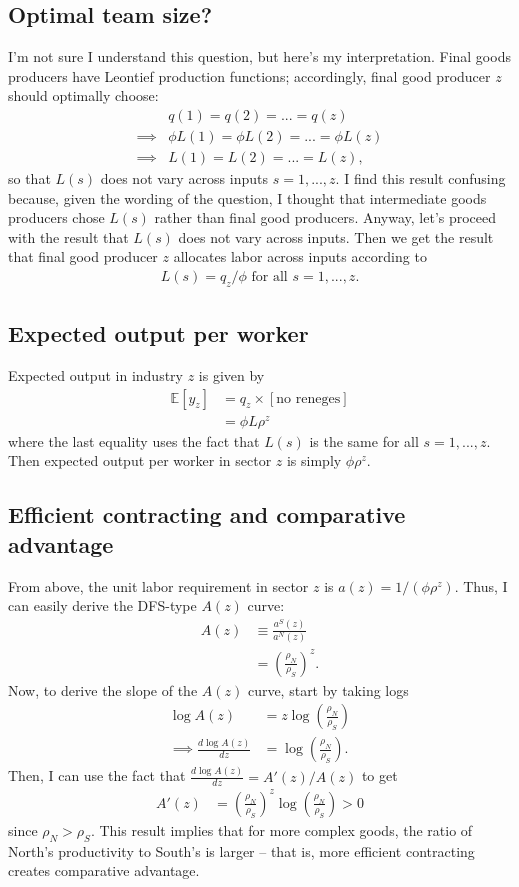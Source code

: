 \documentclass[12pt]{article}
\newcommand{\E}{\mathbb{E}}
\begin{document}
\subsection{Optimal team size?}
I'm not sure I understand this question, but here's my interpretation. Final goods producers have Leontief production functions; accordingly, final good producer $z$ should optimally choose:
\begin{align*}
&q(1) = q(2) = ... =q(z)\\
\implies &\phi L(1) =\phi L(2) = ... = \phi L(z)\\
\implies & L(1) = L(2) =...=L(z),
\end{align*}
so that $L(s)$ does not vary across inputs $s=1,...,z$. I find this result confusing because, given the wording of the question, I thought that intermediate goods producers chose $L(s)$ rather than final good producers. Anyway, let's proceed with the result that $L(s)$ does not vary across inputs. Then we get the result that final good producer $z$ allocates labor across inputs according to
\begin{align*}
L(s) = q_z/\phi \text{ for all } s = 1,...,z.
\end{align*}

\subsection{Expected output per worker}
Expected output in industry $z$ is given by
\begin{align*}
\E[y_z] &= q_z \times [\text{no reneges}]\\
&= \phi L \rho^z
\end{align*}
where the last equality uses the fact that $L(s)$ is the same for all $s = 1,...,z$. Then expected output per worker in sector $z$ is simply $\phi \rho^z$.

\subsection{Efficient contracting and comparative advantage}
From above, the unit labor requirement in sector $z$ is $a(z) = 1/(\phi \rho^z)$. Thus, I can easily derive the DFS-type $A(z)$ curve:
\begin{align*}
A(z) &\equiv \frac{a^S(z)}{a^N(z)}\\
&= \left(\frac{\rho_N}{\rho_S}\right)^z.
\end{align*}
Now, to derive the slope of the $A(z)$ curve, start by taking logs
\begin{align*}
\log A(z) &= z \log\left(\frac{\rho_N}{\rho_S}\right)\\
\implies \frac{d\log A(z) }{dz} &= \log\left(\frac{\rho_N}{\rho_S}\right).
\end{align*}
Then, I can use the fact that $ \frac{d\log A(z) }{dz} = A'(z) /A(z)$ to get
\begin{align*}
A'(z) &= \left(\frac{\rho_N}{\rho_S}\right)^z\log\left(\frac{\rho_N}{\rho_S}\right) > 0
\end{align*}
since $\rho_N > \rho_S$. This result implies that for more complex goods, the ratio of North's productivity to South's is larger -- that is, more efficient contracting creates comparative advantage.
\end{document}
